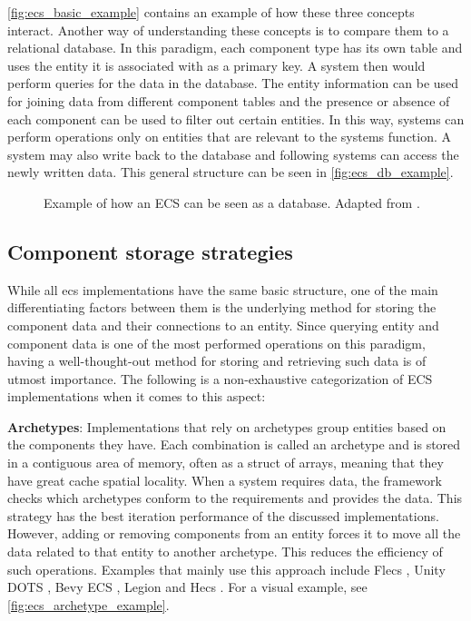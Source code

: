 \documentclass[twoside, 11pt]{article}
\begin{document}
\autoref{fig:ecs_basic_example} contains an example of how these three concepts interact.  Another way of understanding these concepts is to compare them to a relational database. In this paradigm, each component type has its own table and uses the entity it is associated with as a primary key. A system then would perform queries for the data in the database. The entity information can be used for joining data from different component tables and the presence or absence of each component can be used to filter out certain entities. In this way, systems can perform operations only on entities that are relevant to the systems function. A system may also write back to the database and following systems can access the newly written data. This general structure can be seen in \autoref{fig:ecs_db_example}.

\begin{figure}
  \centering
  
  \caption[Example of how an ECS can be seen as a database]{Example of how an ECS can be seen as a database. Adapted from \cite{csherratt}.}
  \label{fig:ecs_db_example}
\end{figure}

\subsection{Component storage strategies}

While all \gls{ecs} implementations have the same basic structure, one of the main differentiating factors between them is the underlying method for storing the component data and their connections to an entity. Since querying entity and component data is one of the most performed operations on this paradigm, having a well-thought-out method for storing and retrieving such data is of utmost importance. The following is a non-exhaustive categorization of ECS implementations when it comes to this aspect:

\textbf{Archetypes}: Implementations that rely on archetypes group entities based on the components they have. Each combination is called an archetype and is stored in a contiguous area of memory, often as a struct of arrays, meaning that they have great cache spatial locality. When a system requires data, the framework checks which archetypes conform to the requirements and provides the data. This strategy has the best iteration performance of the discussed implementations. However, adding or removing components from an entity forces it to move all the data related to that entity to another archetype. This reduces the efficiency of such operations. Examples that mainly use this approach include Flecs \cite{flecs}, Unity DOTS \cite{unityDots}, Bevy ECS \cite{bevy}, Legion \cite{legion} and Hecs \cite{hecs}. For a visual example, see \autoref{fig:ecs_archetype_example}.
\end{document}
